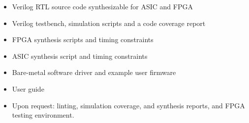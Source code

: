 %

\begin{itemize}
  \itemsep-0.5em
\item Verilog RTL source code synthesizable for ASIC and FPGA
\item Verilog testbench, simulation scripts and a code coverage report
\item FPGA synthesis scripts  and timing constraints
\item ASIC synthesis script and timing constraints
\item Bare-metal software driver and example user firmware
\item User guide
\item Upon request: linting, simulation coverage, and synthesis reports, and FPGA testing environment.
\end{itemize}

